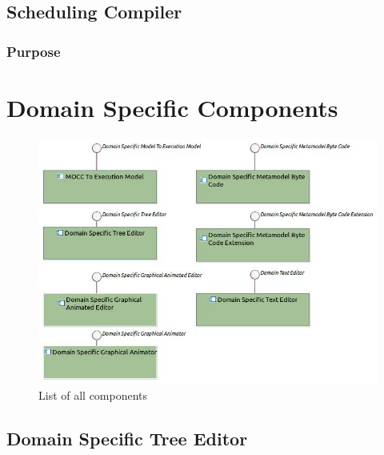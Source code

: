 \documentclass{gemoc} %
\begin{document}


\subsection{Scheduling Compiler}


\subsubsection{Purpose}



\section{Domain Specific Components}
\begin{figure}[bt]
	\begin{center}
	\includegraphics*[trim=0.0cm 0.0cm 0cm 0.0cm, clip=true, width=1.0\linewidth]{../images/DomainSpecificComponents.jpg}
	\caption{List of all components}
	\label{fig:DomainSpecificComponentList}
	\end{center}
\end{figure}
\subsection{Domain Specific Tree Editor}

\end{document}
